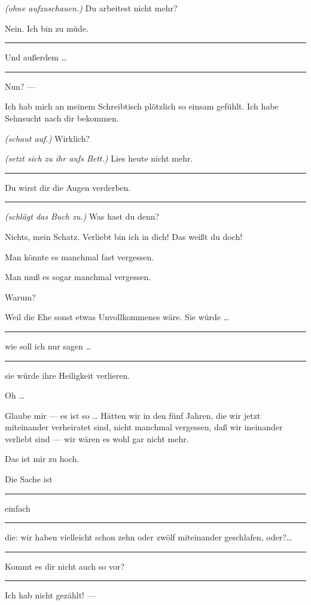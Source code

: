\documentclass[
	final,
	a4paper,
	ngerman,
	mpinclude = true, %
	twoside = true,
	open = right,
	cleardoublepage = plain,
	DIV = 13,
	BCOR = 1cm,
	titlepage = firstiscover,
	]{scrbook}
\newcommand{\direction}[1]{\textit{(#1)}}
\newenvironment{deletion}{%
		\vspace{0.25\baselineskip}
		\hrule
		\vspace{0.25\baselineskip}
		\color{darkgray}
	}{
		\color{black}
		\vspace{0.25\baselineskip}
		\hrule 
		\vspace{0.25\baselineskip}
	}
\newcommand{\thecharacter}[1]{\textup{\textsc{#1}}}
\newcommand{\thefrau}{\thecharacter{Junge Frau}}
\newcommand{\thegatte}{\thecharacter{Gatte}}
\newcommand{\character}[1]{\item[#1:]}
\newcommand{\frau}{\character{\thefrau}}
\newcommand{\gatte}{\character{\thegatte}}
\begin{document}
\begin{play}

	\frau
	\direction{ohne aufzuschauen.} Du arbeitest nicht mehr?

	\gatte
	Nein. Ich bin zu müde.
	\begin{deletion}
	Und außerdem \ldots{}
	\end{deletion}

	\frau
	Nun? ---

	\gatte
	Ich hab mich an meinem Schreibtisch plötzlich so einsam gefühlt. Ich habe Sehnsucht nach dir bekommen.

	\frau
	\direction{schaut auf.} Wirklich?

	\gatte
	\direction{setzt sich zu ihr aufs Bett.} Lies heute nicht mehr.
	\begin{deletion}
	Du wirst dir die Augen verderben.
	\end{deletion}

	\frau
	\direction{schlägt das Buch zu.} Was hast du denn?

	\gatte
	Nichts, mein Schatz. Verliebt bin ich in dich! Das weißt du doch!

	\frau
	Man könnte es manchmal fast vergessen.

	\gatte
	Man muß es sogar manchmal vergessen.

	\frau
	Warum?

	\gatte
	Weil die Ehe sonst etwas Unvollkommenes wäre. Sie würde \ldots{}
	\begin{deletion}
		wie soll ich nur sagen \ldots{}
	\end{deletion}
	sie würde ihre Heiligkeit verlieren.

	\frau
	Oh \ldots{}

	\gatte
	Glaube mir --- es ist so \ldots{} Hätten wir in den fünf Jahren, die wir jetzt miteinander verheiratet sind, nicht manchmal vergessen, daß wir ineinander verliebt sind --- wir wären es wohl gar nicht mehr.

	\frau
	Das ist mir zu hoch.

	\gatte
	Die Sache ist
	\begin{deletion}
		einfach
	\end{deletion}
	die: wir haben vielleicht schon zehn oder zwölf miteinander geschlafen, oder?\ldots{}
	\begin{deletion}
		Kommt es dir nicht auch so vor?
	\end{deletion}

	\frau
	Ich hab nicht gezählt! ---


\end{play}
\end{document}
